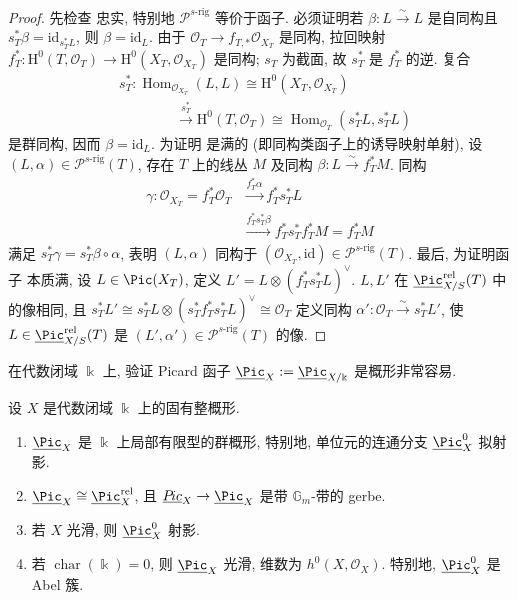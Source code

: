 \begin{proof}
先检查  忠实, 特别地 $\mathcal P^{s\text{-rig}}$ 等价于函子. 必须证明若 $\beta:L\xrightarrow{\sim}L$ 是自同构且 $s_T^*\beta=\mathrm{id}_{s_T^*L}$, 则 $\beta=\mathrm{id}_L$. 由于 $\mathcal O_T\to f_{T,*}\mathcal O_{X_T}$ 是同构, 拉回映射 $f_T^*:\mathrm H^0(T,\mathcal O_T)\to\mathrm H^0(X_T,\mathcal O_{X_T})$ 是同构; $s_T$ 为截面, 故 $s_T^*$ 是 $f_T^*$ 的逆. 复合
\[
\begin{aligned}
&s_T^*:\operatorname{Hom}_{\mathcal O_{X_T}}(L,L)\cong\mathrm H^0(X_T,\mathcal O_{X_T})\\
&\hspace{4em}\xrightarrow{s_T^*}\mathrm H^0(T,\mathcal O_T)\cong\operatorname{Hom}_{\mathcal O_T}(s_T^*L,s_T^*L)
\end{aligned}
\]
是群同构, 因而 $\beta=\mathrm{id}_L$. 为证明  是满的 (即同构类函子上的诱导映射单射), 设 $(L,\alpha)\in\mathcal P^{s\text{-rig}}(T)$, 存在 $T$ 上的线丛 $M$ 及同构 $\beta:L\xrightarrow{\sim}f_T^*M$. 同构
\[
\begin{aligned}
\gamma:\mathcal O_{X_T}=f_T^*\mathcal O_T&\xrightarrow{f_T^*\alpha}f_T^*s_T^*L\\
&\xrightarrow{f_T^*s_T^*\beta}f_T^*s_T^*f_T^*M=f_T^*M
\end{aligned}
\]
满足 $s_T^*\gamma=s_T^*\beta\circ\alpha$, 表明 $(L,\alpha)$ 同构于 $(\mathcal O_{X_T},\mathrm{id})\in\mathcal P^{s\text{-rig}}(T)$. 最后, 为证明函子  本质满, 设 $L\in\Pic(X_T)$, 定义 $L'=L\otimes(f_T^*s_T^*L)^\vee$. $L,L'$ 在 $\underline{\Pic}_{X/S}^{\mathrm{rel}}(T)$ 中的像相同, 且 $s_T^*L'\cong s_T^*L\otimes(s_T^*f_T^*s_T^*L)^\vee\cong\mathcal O_T$ 定义同构 $\alpha':\mathcal O_T\xrightarrow{\sim}s_T^*L'$, 使 $L\in\underline{\Pic}_{X/S}^{\mathrm{rel}}(T)$ 是 $(L',\alpha')\in\mathcal P^{s\text{-rig}}(T)$ 的像.
\end{proof}
在代数闭域 $\Bbbk$ 上, 验证 Picard 函子 $\underline{\Pic}_X:=\underline{\Pic}_{X/\Bbbk}$ 是概形非常容易.
\begin{theorem}\label{src:7.4.65}
设 $X$ 是代数闭域 $\Bbbk$ 上的固有整概形.
\begin{enumerate}[(1)]
\item $\underline{\Pic}_X$ 是 $\Bbbk$ 上局部有限型的群概形, 特别地, 单位元的连通分支 $\underline{\Pic}_X^0$ 拟射影.
\item $\underline{\Pic}_X\cong\underline{\Pic}_X^{\mathrm{rel}}$, 且 $\underline{\mathcal P\!ic}_X\to\underline{\Pic}_X$ 是带 $\mathbb G_m$-带的 gerbe.
\item 若 $X$ 光滑, 则 $\underline{\Pic}_X^0$ 射影.
\item 若 $\operatorname{char}(\Bbbk)=0$, 则 $\underline{\Pic}_X$ 光滑, 维数为 $h^0(X,\mathcal O_X)$. 特别地, $\underline{\Pic}_X^0$ 是 Abel 簇.
\end{enumerate}
\end{theorem}
